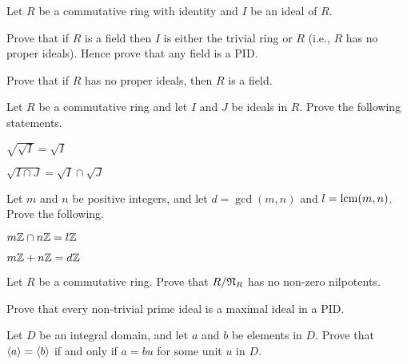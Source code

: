 \begin{problem}\label{problem-ring-is-field-iff-no-proper-ideals}
    Let $R$ be a commutative ring with identity and $I$ be an ideal of $R$.
    \begin{partquestions}{\alph*}
        \item Prove that if $R$ is a field then $I$ is either the trivial ring or $R$ (i.e., $R$ has no proper ideals). Hence prove that any field is a PID.
        \item Prove that if $R$ has no proper ideals, then $R$ is a field.
    \end{partquestions}
\end{problem}

\begin{problem}
    Let $R$ be a commutative ring and let $I$ and $J$ be ideals in $R$. Prove the following statements.
    \begin{partquestions}{\alph*}
        \item $\sqrt{\sqrt{I}} = \sqrt{I}$
        \item $\sqrt{I \cap J} = \sqrt{I} \cap \sqrt{J}$
    \end{partquestions}
\end{problem}

\begin{problem}
    Let $m$ and $n$ be positive integers, and let $d = \gcd(m,n)$ and $l = \mathrm{lcm}(m,n)$. Prove the following.
    \begin{partquestions}{\alph*}
        \item $m\mathbb{Z} \cap n\mathbb{Z} = l\mathbb{Z}$
        \item $m\mathbb{Z} + n\mathbb{Z} = d\mathbb{Z}$
    \end{partquestions}
\end{problem}

\begin{problem}
    Let $R$ be a commutative ring. Prove that $R / \mathfrak{N}_{R}$ has no non-zero nilpotents.
\end{problem}

\begin{problem}
    Prove that every non-trivial prime ideal is a maximal ideal in a PID.
\end{problem}

\begin{problem}
    Let $D$ be an integral domain, and let $a$ and $b$ be elements in $D$. Prove that $\left\langle a\right\rangle = \left\langle b\right\rangle$ if and only if $a = bu$ for some unit $u$ in $D$.
\end{problem}

